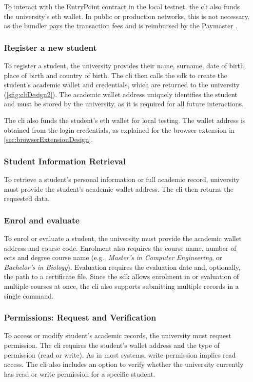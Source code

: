 To interact with the EntryPoint  contract in the local testnet, the \acrshort{cli} also funds the university's \acrshort{eth} wallet. In public or production networks, this is not necessary, as the bundler pays the transaction fees and is reimbursed by the Paymaster .

\subsubsection{Register a new student}
To register a student, the  university provides their name, surname, date of birth, place of birth and country of birth. The \acrshort{cli} then calls the \acrshort{sdk} to create the student's academic wallet and credentials, which are returned to the university (\cref{sfig:cliDesign2}). The academic wallet address uniquely identifies the student and must be stored by the university, as it is required for all future interactions. 

The \acrshort{cli} also funds the student's \acrlong{eth} wallet  for local testing. The wallet address is obtained from the login credentials, as explained  for the browser extension in \cref{sec:browserExtensionDesign}.

\subsubsection{Student Information Retrieval}
To retrieve a student's personal information or full academic record, university must provide the student's academic wallet address. The \acrshort{cli} then returns the requested data.

\subsubsection{Enrol and evaluate}
To enrol or evaluate a student, the university must provide the academic wallet address and course code. Enrolment also requires the course name, number of \acrshort{ects} and degree course name (e.g., \textit{Master's in Computer Engineering}, or \textit{Bachelor's in Biology}). Evaluation requires the evaluation date and, optionally, the path to a certificate file. Since the \acrshort{sdk} allows enrolment in or evaluation of multiple courses at once, the \acrshort{cli} also supports submitting multiple records in a single command.     

\subsubsection{Permissions: Request and Verification}
To access or modify student's academic records, the university must request permission. The \acrshort{cli} requires the student's wallet address and the type of permission (read or write). As in most systems, write permission implies read access.
The \acrshort{cli} also includes an option to verify whether the university currently has read or write permission for a specific student.

